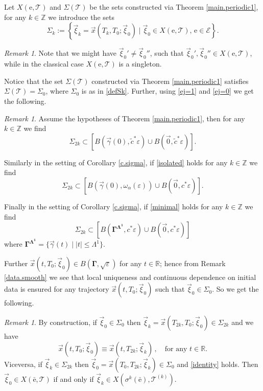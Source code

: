 \documentclass[10pt]{article}
\numberwithin{equation}{section}
\def\ga{\vec{\gamma}}
\def\ep{\varepsilon}
\def\Z{{\mathbb Z}}
\def\R{{\mathbb R}}
\def\ee{{\mathrm e}}
\def\EE{{\mathcal E}}
\def\TT{{\mathcal T}}
\def\xxi{\vec{\xi}}
\def\x{\vec{x}}
\newcommand\bs[1]{{\boldsymbol{#1}}}
\theoremstyle{definition}
\theoremstyle{remark}
\newtheorem{remark}[theorem]{Remark}
\begin{document}
Let $X(\ee, \TT)$  and $\Sigma(\TT)$ be the sets constructed via Theorem \ref{main.periodic1},
for any $k \in \Z$ we introduce the sets
\begin{equation}\label{defSk}
\Sigma_k := \left\{ \xxi_k= \x(T_{k}, T_0; \xxi_0) \mid \xxi_0 \in X(\ee,\TT), \, \ee \in \EE \right\}.
\end{equation}

\begin{remark}\label{notunique}
  Note that we  might have  $\xxi_0' \ne \xxi_0''$, such that $\xxi_0',\xxi_0'' \in  X(\ee,\TT)$, while in the classical case
  $X(\ee,\TT)$ is a singleton.
\end{remark}





Notice that the set $\Sigma(\TT)$ constructed via Theorem \ref{main.periodic1} satisfies
$\Sigma(\TT)= \Sigma_0$, where $\Sigma_0$ is as  in \eqref{defSk}.
 Further, using  \eqref{ej=1} and \eqref{ej=0} we get the following.

 \begin{remark}\label{remtwo}
 Assume the hypotheses of Theorem \ref{main.periodic1}, then for any $k \in \Z$ we find
$$ \Sigma_{2k} \subset [B(\ga(0), \tilde{c}^* \ep) \cup B(\vec{0}, \tilde{c}^* \ep)].$$


 Similarly  in the setting of Corollary  \ref{c.sigma}, if \eqref{isolated} holds for any $k \in \Z$ we find
$$
\Sigma_{2k} \subset [B(\ga(0), \omega_\alpha(\ep)) \cup B(\vec{0}, c^* \ep)].$$


Finally   in the setting of Corollary  \ref{c.sigma}, if \eqref{minimal} holds for any $k \in \Z$ we find
$$
\Sigma_{2k} \subset [B(\bs{\Gamma^{\Lambda^1}}, c^* \ep) \cup B(\vec{0}, c^* \ep)]$$
 where $\bs{\Gamma^{\Lambda^1}}= \{ \ga(t)
\mid |t| \le \Lambda^1\}$.
 \end{remark}


Further   $\x(t,T_0; \xxi_0) \in B(\bs{\Gamma}, \sqrt{\ep})$
for any $t \in \R$; hence from Remark  \ref{data.smooth} we see that local
 uniqueness and continuous dependence on initial data is ensured for any
trajectory $\x(t,T_0; \xxi_0)$ such that $\xxi_0 \in \Sigma_0$.
So we get the following.
\begin{remark}\label{remone}
  By construction, if $\xxi_0 \in \Sigma_0$ then $\xxi_k= \x(T_{2k},T_0; \xxi_0) \in \Sigma_{2k}$ and we have
  \begin{equation}\label{identity}
    \x(t,T_0; \xxi_0) \equiv \x(t,T_{2k}; \xxi_k)   \, , \quad \textrm{for any $t \in \R$}.
  \end{equation}
 Viceversa, if $\xxi_k \in \Sigma_{2k}$ then  $\xxi_0= \x(T_0,T_{2k}; \xxi_k) \in \Sigma_0$ and \eqref{identity} holds.
  Then
  $\xxi_0 \in X(\bar{\ee}, \TT)$ if and only if $\xxi_k \in X(\sigma^k(\bar{\ee}), \TT^{(k)})$.
 \end{remark}
\end{document}
